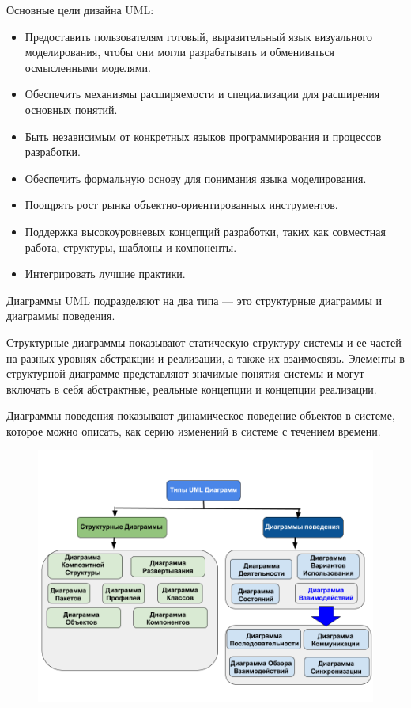 \documentclass[bachelor, och, pract]{SCWorks}
\theoremstyle{remark}
\begin{document}
    Основные цели дизайна UML:

    \begin{itemize}[label=$\bullet$]
        \item Предоставить пользователям готовый, выразительный язык визуального моделирования, чтобы они могли разрабатывать и обмениваться осмысленными моделями.
        \item Обеспечить механизмы расширяемости и специализации для расширения основных понятий.
        \item Быть независимым от конкретных языков программирования и процессов разработки.
        \item Обеспечить формальную основу для понимания языка моделирования.
        \item Поощрять рост рынка объектно-ориентированных инструментов.
        \item Поддержка высокоуровневых концепций разработки, таких как совместная работа, структуры, шаблоны и компоненты.
        \item Интегрировать лучшие практики.
    \end{itemize}

    Диаграммы UML подразделяют на два типа — это структурные диаграммы и диаграммы поведения.

    Структурные диаграммы показывают статическую структуру системы и ее частей на разных уровнях абстракции и реализации, а также их взаимосвязь. Элементы в структурной диаграмме представляют значимые понятия системы и могут включать в себя абстрактные, реальные концепции и концепции реализации.
    
    Диаграммы поведения показывают динамическое поведение объектов в системе, которое можно описать, как серию изменений в системе с течением времени. 

    \begin{figure}[H]
        \begin{center}
            \includegraphics[scale=0.5]{res/type-uml.png}
        \end{center}
    \end{figure}
\end{document}
